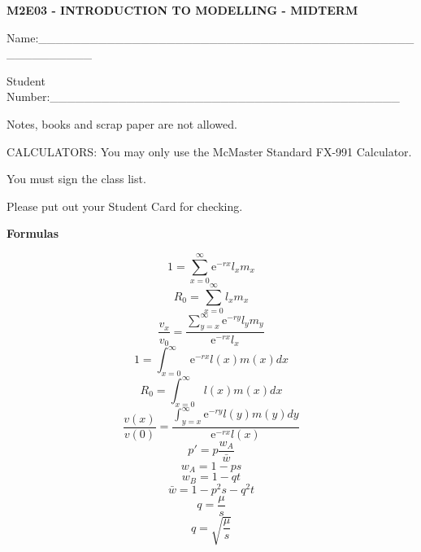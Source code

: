 \documentclass[reqno,12pt]{amsart}
\def\eee{\textrm{e}}
\begin{document}
\begin{center}
{\bf M2E03 - INTRODUCTION TO MODELLING - MIDTERM}
\end{center}

\vspace{2cm}

\noindent
Name:\_\_\_\_\_\_\_\_\_\_\_\_\_\_\_\_\_\_\_\_\_\_\_\_\_\_\_\_\_\_\_\_\_\_\_\_\_\_\_\_\_\_\_\_\_\_\_\_\_\_\_\_\_\_

\vspace{2cm}

\noindent
Student Number:\_\_\_\_\_\_\_\_\_\_\_\_\_\_\_\_\_\_\_\_\_\_\_\_\_\_\_\_\_\_\_\_\_\_\_\_\_\_\_\_\_

\vspace{1.5cm}
\noindent
Notes, books and scrap paper are not allowed.

\vspace{1.5cm}
\noindent
CALCULATORS:  You may only use the McMaster Standard FX-991 Calculator.

\vspace{1.5cm}
\noindent
You must sign the class list.

\vspace{1.5cm}
\noindent
Please put out your Student Card for checking.


\newpage

\begin{center}
{\bf Formulas}
\end{center}

\vspace{.5cm}
$$
1 = \sum_{x=0}^\infty \eee^{-rx} l_x m_x
$$
\vspace{.5cm}
$$
R_0 = \sum_{x=0}^\infty l_x m_x
$$
\vspace{.5cm}
$$
\frac{v_x}{v_0} =
\frac{ \sum_{y=x}^\infty \eee^{-ry} l_y m_y}{\eee^{-rx} l_x}
$$
\vspace{.5cm}
$$
1 = \int_{x=0}^\infty \eee^{-rx} l(x) m(x) dx
$$
\vspace{.5cm}
$$
R_0 = \int_{x=0}^\infty l(x) m(x) dx
$$
\vspace{.5cm}
$$
\frac{v(x)}{v(0)} =
\frac{ \int_{y=x}^\infty \eee^{-ry} l(y) m(y) dy}{\eee^{-rx} l(x)}
$$
\vspace{.5cm}
$$
p' = p \frac{w_A}{\bar w}
$$
\vspace{.4cm}
$$
w_A = 1-p s
$$
\vspace{.4cm}
$$
w_B = 1-q t
$$
\vspace{.4cm}
$$
\bar w = 1 - p^2 s -q^2 t
$$
\vspace{.4cm}
$$
q = \frac \mu s
$$
\vspace{.4cm}
$$
q = \sqrt{\frac \mu s}
$$
\end{document}
